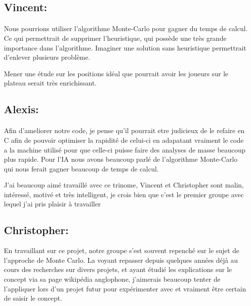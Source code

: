 \documentclass[
	headsepline=on,
	footsepline=on,
	twoside=off,
	abstract=on,
	DIV=10
]{scrreprt}
\begin{document}
				 
				\subsection{Vincent: } 
				\paragraph{}
				Nous pourrions utiliser l'algorithme Monte-Carlo pour gagner du temps de calcul. 
				Ce qui permettrait de supprimer l'heuristique, qui possède une très grande importance dans l'algorithme. 
				Imaginer une solution sans heuristique permettrait d'enlever plusieurs problème.
				
				Mener une étude sur les positions idéal que pourrait avoir les joueurs sur le plateau serait très enrichissant.

				\subsection{Alexis:} 
				\paragraph{}
				
				Afin d'ameliorer notre code, je pense qu'il pourrait etre judicieux de le refaire en C afin de pouvoir optimiser la rapidité de celui-ci en adapatant vraiment le code a la machine utilisé pour que celle-ci puisse faire des analyses  de masse beaucoup plus rapide.  Pour l'IA nous avons beaucoup parlé de l'algorithme Monte-Carlo qui nous ferait gagner beaucoup de temps de calcul.
				
				J'ai beaucoup aimé travaillé avec ce trinome, Vincent et Christopher sont malin, intéressé, motivé et très intelligent, je crois bien que c'est le premier groupe avec lequel j'ai pris plaisir à travailler

				\subsection{Christopher:} 
				En travaillant sur ce projet, notre groupe s'est souvent repenché sur le sujet de l'approche de Monte Carlo. 
				La voyant repasser depuis quelques années déjà au cours des recherches sur divers projets, et ayant étudié les explications sur le concept via sa page wikipédia anglophone, j'aimerais beaucoup tenter de l'appliquer lors d'un projet futur pour expérimenter avec et vraiment être certain de saisir le concept.
				
\end{document}
